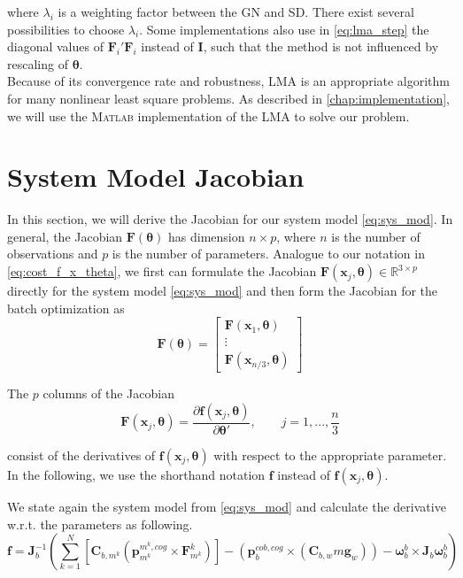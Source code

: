 where $\lambda_i$ is a weighting factor between the GN and SD.
There exist several possibilities to choose $\lambda_i$.
Some implementations also use in \cref{eq:lma_step} the diagonal values of $\mathbf{F}_i' \mathbf{F}_i$ instead of $\mathbf{I}$, such that the method is not influenced by rescaling of $\boldsymbol{\theta}$.
\\

Because of its convergence rate and robustness, LMA is an appropriate algorithm for many nonlinear least square problems.
As described in \cref{chap:implementation}, we will use the \textsc{Matlab} implementation of the LMA to solve our problem.

\section{System Model Jacobian}
In this section, we will derive the Jacobian for our system model \cref{eq:sys_mod}.
In general, the Jacobian $\mathbf{F}(\boldsymbol{\theta})$ has dimension $n \times p$, where $n$ is the number of observations and $p$ is the number of parameters.
Analogue to our notation in \cref{eq:cost_f_x_theta}, we first can formulate the Jacobian $\mathbf{F}(\mathbf{x}_j, \boldsymbol{\theta}) \in \mathbb{R}^{3\times p}$ directly for the system model \cref{eq:sys_mod} and then form the Jacobian for the batch optimization as
\begin{equation}
\mathbf{F}(\boldsymbol{\theta}) = \left[ \begin{array}{c}
\mathbf{F}(\mathbf{x}_1, \boldsymbol{\theta}) \\
\vdots \\
\mathbf{F}(\mathbf{x}_{n/3}, \boldsymbol{\theta})
\end{array} \right]
\end{equation}

The $p$ columns of the Jacobian
\begin{equation}
\mathbf{F}(\mathbf{x}_j, \boldsymbol{\theta}) = 
\frac{\partial \mathbf{f}(\mathbf{x}_j, \boldsymbol{\theta})} {\partial \boldsymbol{\theta}'}
, \qquad j=1,...,\frac{n}{3}
\end{equation}

consist of the derivatives of $\mathbf{f}(\mathbf{x}_j, \boldsymbol{\theta})$
with respect to the appropriate parameter.
In the following, we use the shorthand notation $\mathbf{f}$
instead of $\mathbf{f}(\mathbf{x}_j, \boldsymbol{\theta})$.

We state again the system model from \cref{eq:sys_mod} and calculate the derivative w.r.t. the parameters as following.
\begin{equation*}
\mathbf{f}
= \mathbf{J}_b^{-1} \left( 
\sum_{k=1}^N  \left[  \mathbf{C}_{b,m^k} \left( \mathbf{p}^{m^k,cog}_{m^k} \times \mathbf{F}^k_{m^k} \right)  \right]
-
\left( \mathbf{p}^{cob,cog}_b \times (\mathbf{C}_{b,w}m\mathbf{g}_w) \right)
- \boldsymbol{\omega}_b^b \times \mathbf{J}_b \boldsymbol{\omega}_b^b \right)
\end{equation*}


